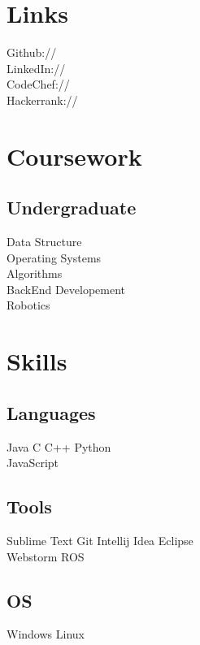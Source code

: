 \documentclass[]{resume-openfont}
\begin{document}
\begin{minipage}[t]{0.33\textwidth}
\section{Links} 
Github:// \href{https://github.com/Abheet099}{} \\
LinkedIn://  \href{https://www.linkedin.com/in/abheet-verma-44854910a/}{} \\
CodeChef://  \href{https://codechef.com/users/coder099}{} \\
Hackerrank://  \href{https://www.hackerrank.com/abheetverma099}{}
\sectionsep


\section{Coursework}

\subsection{Undergraduate}
Data Structure\\
Operating Systems \\
Algorithms \\
BackEnd Developement \\
Robotics \\
\sectionsep


\section{Skills}
\subsection{Languages}
Java \textbullet{}   C \textbullet{} C++ \textbullet{} Python \\
JavaScript
\subsection{Tools}
Sublime Text \textbullet{} Git \textbullet{} Intellij Idea \textbullet{} Eclipse  \\
Webstorm \textbullet{} ROS
\subsection{OS}
Windows \textbullet{} Linux

\end{minipage}
\end{document}
